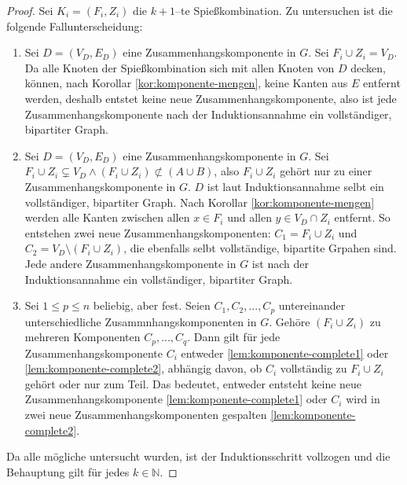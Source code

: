 \begin{proof}
Sei $K_i = (F_i, Z_i)$ die $k+1$--te Spießkombination.
Zu untersuchen ist die folgende Fallunterscheidung:
\begin{enumerate}[label={\upshape(\roman*)}]
  \item Sei $D = (V_D, E_D)$ eine Zusammenhangskomponente in $G$. Sei $F_i \cup Z_i = V_D$.
  Da alle Knoten der Spießkombination sich mit allen Knoten von $D$ decken,
  können, nach Korollar \ref{kor:komponente-mengen}, keine Kanten aus $E$ entfernt werden, deshalb
  entstet keine neue Zusammenhangskomponente, also ist jede Zusammenhangskomponente
  nach der Induktionsannahme ein vollständiger, bipartiter Graph.\label{lem:komponente-complete1} 
  \item Sei $D = (V_D, E_D)$ eine Zusammenhangskomponente in $G$. Sei $F_i \cup Z_i \subsetneq V_D
  \land (F_i \cup Z_i) \not\subset (A \cup B)$, also $F_i \cup Z_i$ gehört nur zu einer
  Zusammenhangskomponente in $G$.
  $D$ ist laut Induktionsannahme selbt ein vollständiger, bipartiter Graph.
  Nach Korollar \ref{kor:komponente-mengen} werden alle Kanten zwischen 
  allen $x \in F_i$ und allen $y \in V_D \cap Z_i$ entfernt.
  So entstehen zwei neue Zusammenhangskomponenten:
  $C_1 = F_i \cup Z_i$ und $C_2 = V_D \setminus (F_i \cup Z_i)$, die ebenfalls selbt 
  vollständige, bipartite Grpahen sind.
  Jede andere Zusammenhangskomponente in $G$ ist
  nach der Induktionsannahme ein vollständiger, bipartiter Graph.\label{lem:komponente-complete2} 
  \item Sei $1 \leqslant p \leqslant n$ beliebig, aber fest.
  Seien $C_1, C_2, ..., C_p$ untereinander unterschiedliche Zusammnhangskomponenten in $G$.
  Gehöre $(F_i \cup Z_i)$ zu mehreren Komponenten $C_p, ..., C_q$.
  Dann gilt für jede Zusammenhangskomponente $C_i$ entweder \ref{lem:komponente-complete1} 
  oder \ref{lem:komponente-complete2}, abhängig davon, ob $C_i$ vollständig zu $F_i \cup Z_i$
  gehört oder nur zum Teil. Das bedeutet, entweder entsteht keine neue Zusammenhangskomponente 
  \ref{lem:komponente-complete1} oder $C_i$ wird in zwei neue Zusammenhangskomponenten gespalten
  \ref{lem:komponente-complete2}.
\end{enumerate}

Da alle mögliche untersucht wurden, ist der Induktionsschritt vollzogen und die Behauptung gilt für jedes
$k \in \mathbb{N}$.
\end{proof}

